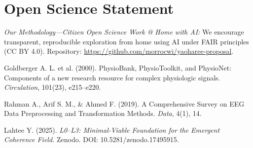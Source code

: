 \documentclass[12pt,a4paper]{article}
\begin{document}
\section*{Open Science Statement}
\textit{Our Methodology—Citizen Open Science Work @ Home with AI:}
We encourage transparent, reproducible exploration from home using AI under FAIR principles (CC BY 4.0).  
Repository: \url{https://github.com/morrocwi/yaoharee-proposal}.

\begin{thebibliography}{9}
Goldberger A. L. et al. (2000). PhysioBank, PhysioToolkit, and PhysioNet: Components of a new research resource for complex physiologic signals. \textit{Circulation}, 101(23), e215–e220.

Rahman A., Arif S. M., \& Ahmed F. (2019). A Comprehensive Survey on EEG Data Preprocessing and Transformation Methods. \textit{Data}, 4(1), 14.

Lahtee Y. (2025). \textit{L0–L3: Minimal-Viable Foundation for the Emergent Coherence Field.} Zenodo. DOI: 10.5281/zenodo.17495915.
\end{thebibliography}
\end{document}
